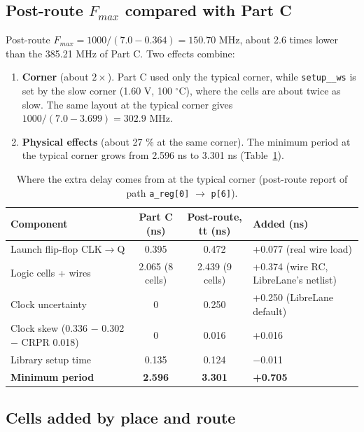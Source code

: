 \documentclass[10pt,a4paper,twocolumn]{article}
\begin{document}
\subsection{Post-route $F_{max}$ compared with Part C}

Post-route $F_{max} = 1000/(7.0 - 0.364) = 150.70$ MHz, about 2.6 times lower than the 385.21 MHz of
Part C. Two effects combine:
\begin{enumerate}[nosep]
  \item \textbf{Corner} (about $2\times$). Part C used only the typical corner, while \texttt{setup\_\_ws} is set
        by the slow corner (1.60 V, 100 $^\circ$C), where the cells are about twice as slow. The same layout at
        the typical corner gives $1000/(7.0 - 3.699) = 302.9$ MHz.
  \item \textbf{Physical effects} (about 27 \% at the same corner). The minimum period at the typical corner
        grows from 2.596 ns to 3.301 ns (Table~\ref{tab:fmaxbreak}).
\end{enumerate}

\begin{table}[!t]
\centering
\small
\begin{tabular}{>{\raggedright\arraybackslash}p{5.0cm}cc>{\raggedright\arraybackslash}p{4.2cm}}
\toprule
\textbf{Component} & \textbf{Part C (ns)} & \textbf{Post-route, tt (ns)} & \textbf{Added (ns)} \\
\midrule
Launch flip-flop CLK$\rightarrow$Q & 0.395 & 0.472 & +0.077 (real wire load) \\
Logic cells + wires & 2.065 (8 cells) & 2.439 (9 cells) & +0.374 (wire RC, LibreLane's netlist) \\
Clock uncertainty & 0 & 0.250 & +0.250 (LibreLane default) \\
Clock skew (0.336 $-$ 0.302 $-$ CRPR 0.018) & 0 & 0.016 & +0.016 \\
Library setup time & 0.135 & 0.124 & $-$0.011 \\
\midrule
\textbf{Minimum period} & \textbf{2.596} & \textbf{3.301} & \textbf{+0.705} \\
\bottomrule
\end{tabular}
\caption{Where the extra delay comes from at the typical corner (post-route report of path
\texttt{a\_reg[0]} $\rightarrow$ \texttt{p[6]}).}\label{tab:fmaxbreak}
\end{table}



\subsection{Cells added by place and route}
\end{document}
